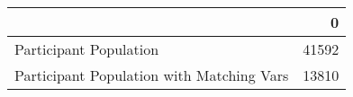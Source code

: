 \begin{tabular}{lr}
\toprule
{} &      0 \\
\midrule
Participant Population                    &  41592 \\
Participant Population with Matching Vars &  13810 \\
\bottomrule
\end{tabular}

